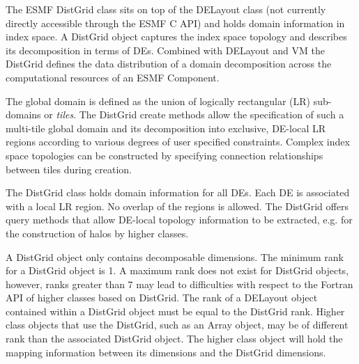 %


\label{sec:DistGrid}
The ESMF DistGrid class sits on top of the DELayout class (not currently
directly accessible through the ESMF C API) and holds domain
information in index space. 
A DistGrid object captures the index space topology
and describes its decomposition in terms of DEs. Combined with DELayout and VM
the DistGrid defines the data distribution of a domain decomposition across the
computational resources of an ESMF Component.

The global domain is defined as the union of logically
rectangular (LR) sub-domains or {\em tiles}. The DistGrid create methods allow
the specification of such a multi-tile global domain and its decomposition into
exclusive, DE-local LR regions according to various degrees of user specified
constraints. Complex index space topologies can be constructed by specifying
connection relationships between tiles during creation.

The DistGrid class holds domain information for all DEs. Each DE is associated
with a local LR region. No overlap of the regions is allowed. The DistGrid
offers query methods that allow DE-local topology information to be extracted,
e.g. for the construction of halos by higher classes.

A DistGrid object only contains decomposable dimensions. The minimum rank for a
DistGrid object is 1. A maximum rank does not exist for DistGrid objects, 
however, ranks greater than 7 may lead to difficulties with respect to the
Fortran API of higher classes based on DistGrid. The rank of a DELayout object
contained within a DistGrid object must be equal to the DistGrid rank. Higher
class objects that use the DistGrid, such as an Array object, may be of
different rank than the associated DistGrid object. The higher class object
will hold the mapping information between its dimensions and the DistGrid
dimensions.
